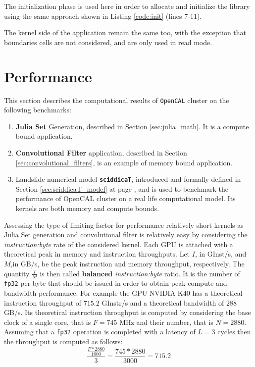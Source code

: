 The initialization phase is used here in order to allocate and initialize the library using the same approach shown in Listing \ref{code:init} (lines 7-11).

The kernel side of the application remain the same too, with the exception that boundaries cells are not considered, and are only used in read mode. 

\section{Performance}
This section describes the computational results of \texttt{OpenCAL} cluster on the following benchmarks:

\begin{enumerate}
	\item \textbf{Julia Set} Generation, described in Section \ref{sec:julia_math}. It is a compute bound application.
	\item \textbf{Convolutional Filter} application, described in Section \ref{sec:convolutional_filters}, is an example of memory bound application.
	\item Landslide numerical model \texttt{\textbf{sciddicaT}}, introduced and formally defined in Section \ref{sec:sciddicaT_model} at page \pageref{sec:sciddicaT_model}, and is used to benchmark the performance of OpenCAL cluster on a real life computational model. Its kernels are both memory and compute bounds.
\end{enumerate}
Assessing the type of limiting factor for performance relatively short kernels as Julia Set generation and convolutional filter is relatively easy by considering the \textit{instruction:byte} rate of the considered kernel.
Each GPU is attached with a theoretical peak in memory and instruction throughputs\cite{Volkov:EECS-2016-143}.
Let $I$, in \si{GInst/s}, and $M$,in \si{GB/s}, be the peak instruction and memory throughput, respectively. The quantity $\frac{I}{M}$ is then called \textbf{balanced} \textit{instruction:byte} ratio. It is the number of \texttt{fp32} per byte that should be issued in order to obtain peak compute and bandwidth performance.
For example the GPU NVIDIA K40 has a theoretical instruction throughput of $715.2$ \si{GInstr/s} and a theoretical bandwidth of $288$ \si{GB/s}. 
Its theoretical instruction throughput is computed by considering the base clock of a single core, that is $F=745$ \si{MHz} and their number, that is $N=2880$. Assuming that a \texttt{fp32} operation is completed with a latency of $L=3$ cycles then the throughput is computed as follows:
\[
	\frac{\frac{F*2880}{1000}}{3} = \frac{745*2880}{3000} = 715.2
\]

